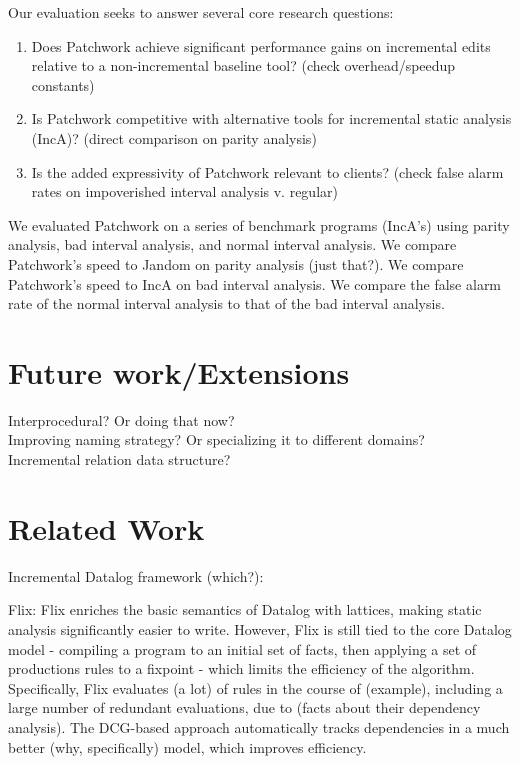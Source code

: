 \documentclass[acmlarge,anonymous]{acmart}\settopmatter{printfolios=true}
\begin{document}
Our evaluation seeks to answer several core research questions:

\begin{enumerate}
    \item Does Patchwork achieve significant performance gains on incremental edits relative to a non-incremental baseline tool? (check overhead/speedup constants)
    \item Is Patchwork competitive with alternative tools for incremental static analysis (IncA)? (direct comparison on parity analysis)
    \item Is the added expressivity of Patchwork relevant to clients? (check false alarm rates on impoverished interval analysis v. regular)
\end{enumerate}

We evaluated Patchwork on a series of benchmark programs (IncA's) using parity analysis, bad interval analysis, and normal interval analysis. We compare Patchwork's speed to Jandom on parity analysis (just that?). We compare Patchwork's speed to IncA on bad interval analysis. We compare the false alarm rate of the normal interval analysis to that of the bad interval analysis.

\section{Future work/Extensions}

Interprocedural? Or doing that now?\\
Improving naming strategy? Or specializing it to different domains?\\
Incremental relation data structure?

\section{Related Work}

Incremental Datalog framework (which?):

Flix: Flix enriches the basic semantics of Datalog with lattices, making static analysis significantly easier to write. However, Flix is still tied to the core Datalog model - compiling a program to an initial set of facts, then applying a set of productions rules to a fixpoint - which limits the efficiency of the algorithm. Specifically, Flix evaluates (a lot) of rules in the course of (example), including a large number of redundant evaluations, due to (facts about their dependency analysis). The DCG-based approach automatically tracks dependencies in a much better (why, specifically) model, which improves efficiency.
\end{document}
